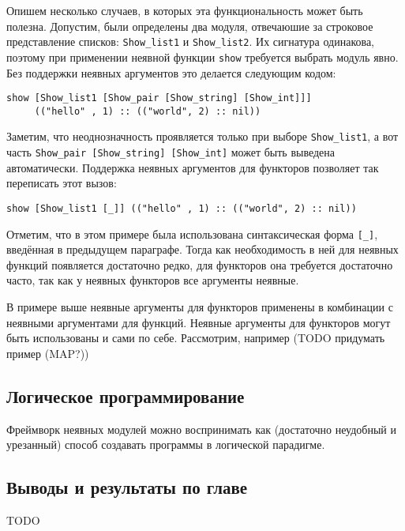 \documentclass[../diploma.tex]{subfiles}
\begin{document}
Опишем несколько случаев, в которых эта функциональность может быть полезна. Допустим, были определены два модуля, отвечаюшие за строковое представление списков: \texttt{Show_list1} и \texttt{Show_list2}. Их сигнатура одинакова, поэтому при применении неявной функции \texttt{show} требуется выбрать модуль явно. Без поддержки неявных аргументов это делается следующим кодом:

\begin{verbatim}
show [Show_list1 [Show_pair [Show_string] [Show_int]]]
     (("hello" , 1) :: (("world", 2) :: nil))
\end{verbatim}

Заметим, что неоднозначность проявляется только при выборе \texttt{Show_list1}, а вот часть \texttt{Show_pair [Show_string] [Show_int]} может быть выведена автоматически. Поддержка неявных аргументов для функторов позволяет так переписать этот вызов:

\begin{verbatim}
show [Show_list1 [_]] (("hello" , 1) :: (("world", 2) :: nil))
\end{verbatim}

Отметим, что в этом примере была использована синтаксическая форма \texttt{[_]}, введённая в предыдущем параграфе. Тогда как необходимость в ней для неявных функций появляется достаточно редко, для функторов она требуется достаточно часто, так как у неявных функторов все аргументы неявные.

В примере выше неявные аргументы для функторов применены в комбинации с неявными аргументами для функций. Неявные аргументы для функторов могут быть использованы и сами по себе. Рассмотрим, например (TODO придумать пример (MAP?))

\subsection{Логическое программирование}

Фреймворк неявных модулей можно воспринимать как (достаточно неудобный и урезанный) способ создавать программы в логической парадигме. 

\subsection{Выводы и результаты по главе}

TODO
\end{document}
